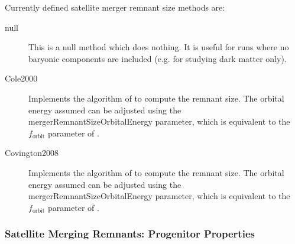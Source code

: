 Currently defined satellite merger remnant size methods are:
\begin{description}
 \item [{\normalfont \ttfamily null}] This is a null method which does nothing. It is useful for runs where no baryonic components are included (e.g. for studying dark matter only).
 \item [{\normalfont \ttfamily Cole2000}] Implements the algorithm of \cite{cole_hierarchical_2000} to compute the remnant size. The orbital energy assumed can be adjusted using the {\normalfont \ttfamily mergerRemnantSizeOrbitalEnergy} parameter, which is equivalent to the $f_\mathrm{orbit}$ parameter of \cite{cole_hierarchical_2000}.
 \item [{\normalfont \ttfamily Covington2008}] Implements the algorithm of \cite{covington_predicting_2008} to compute the remnant size. The orbital energy assumed can be adjusted using the {\normalfont \ttfamily mergerRemnantSizeOrbitalEnergy} parameter, which is equivalent to the $f_\mathrm{orbit}$ parameter of \cite{cole_hierarchical_2000}.
\end{description}

\subsubsection{Satellite Merging Remnants: Progenitor Properties}

